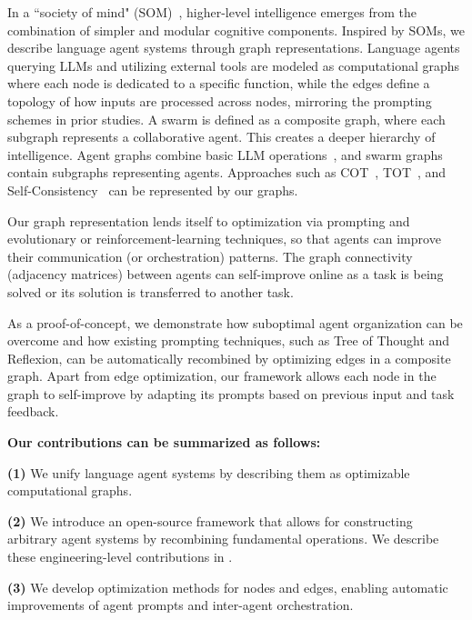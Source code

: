 \documentclass{article}
\theoremstyle{plain}
\theoremstyle{definition}
\theoremstyle{remark}
\begin{document}
In a ``society of mind" (SOM)~\citep{minsky1988society,zhuge2023mindstorms}, higher-level intelligence emerges from the combination of simpler and modular cognitive components. Inspired by SOMs, we describe language agent systems through graph representations.
Language agents querying LLMs and utilizing external tools are modeled as computational graphs where each node is dedicated to a specific function, while the edges define a topology of how inputs are processed across nodes, mirroring the prompting schemes in prior studies.
A swarm is defined as a composite graph, where each subgraph represents a collaborative agent.
This creates a deeper hierarchy of intelligence. Agent graphs combine basic LLM operations~\citep{kennedy2006swarm,nepusz2013hierarchical}, and swarm graphs contain subgraphs representing agents.
Approaches such as COT~\citep{wei2022chain}, TOT~\citep{yao2023tree}, and Self-Consistency~\citep{wang2022self} can be represented by our graphs.

Our graph representation lends itself to optimization via prompting and evolutionary or reinforcement-learning techniques, so that agents can improve their communication (or orchestration) patterns. The graph connectivity (adjacency matrices) between agents can self-improve online as a task is being solved or its solution is transferred to another task.

As a proof-of-concept, we demonstrate how suboptimal agent organization can be overcome and how existing prompting techniques, such as Tree of Thought and Reflexion, can be automatically recombined by optimizing edges in a composite graph.
Apart from edge optimization, our framework allows each node in the graph to self-improve by adapting its prompts based on previous input and task feedback.

\textbf{Our contributions can be summarized as follows:}

\noindent \textbf{(1)} We unify language agent systems by describing them as optimizable computational graphs.
\vspace{-3pt}

\noindent \textbf{(2)} We introduce an open-source framework that allows for constructing arbitrary agent systems by recombining fundamental operations.
We describe these engineering-level contributions in .
\vspace{-3pt}

\noindent \textbf{(3)}  We develop optimization methods for nodes and edges, enabling automatic improvements of agent prompts and inter-agent orchestration.
\vspace{-3pt}
\end{document}
